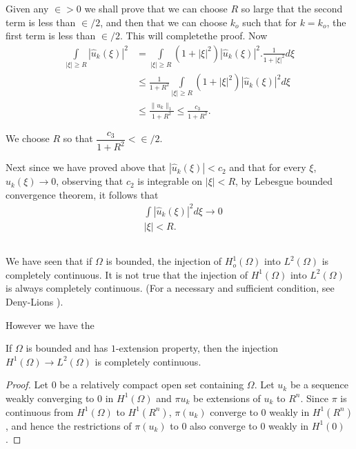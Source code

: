 \noindent
Given any $\in > 0$ we shall prove that we can choose $R$ so
large that the second term is less than $\in / 2$, and then
that we can choose $k_o$ such that for $k = k_o$, the first term is
less than $\in / 2$. This will complete\pageoriginale the proof. Now 
\begin{align*}
\int\limits_{|\xi| \geq R} |\hat{u}_k (\xi )|^2 & = \int\limits_{|\xi|
  \geq R} (1+ |\xi|^2) |\hat{u}_k (\xi )|^2 . \frac{1}{1+ |\xi |^2} d
\xi\\ 
& \leq \frac{1}{1+ R^2} \int\limits_{|\xi| \geq R} (1+ |\xi|^2)
|\hat{u}_k (\xi )|^2 d\xi\\ 
&\leq \frac{\| u_k \|_1}{1+R^2} \leq \frac{c_3 }{1+ R^2}.
\end{align*}

We choose $R$ so that $\dfrac{c_3}{1+ R^2} < \in / 2$.

Next since we have proved above that $|\hat{u}_k (\xi )| < c_2$ and
that for every $\xi$, $\hat{u}_k (\xi) \to 0$, observing that $c_2$ is
integrable on $|\xi| < R$, by Lebesgue bounded convergence theorem, it
follows that 
\begin{align*}
 &\int |\hat{u}_k (\xi )|^2 d \xi \to 0\\
 & |\xi |< R.
\end{align*}

\subsection{}\label{lec9:sec5:subsec2}  %

We have seen that if $\Omega$ is bounded, the
injection of $H^1_o (\Omega)$ into $L^2 (\Omega)$ is completely
continuous. It is not true that the injection of $H^1(\Omega)$ into
$L^2 (\Omega)$ is always completely continuous. (For a  necessary and
sufficient condition, see Deny-Lions \cite{k7}). 

However we have the
\begin{theorem}\label{lec9:sec5:subsec2:thm5.2}%
 If $\Omega$ is bounded and has $1$-extension property, then the
 injection $H^1 (\Omega) \to L^2 (\Omega)$ is completely continuous. 
\end{theorem}

\begin{proof}
Let $0$ be a relatively compact open set containing $\Omega$. Let
$u_k$ be a sequence weakly converging to $0$ in $H^1 (\Omega)$ and
$\pi u_k$ be extensions of $u_k$ to $R^n$. Since $\pi$ is continuous
from $H^1 (\Omega)$ to $H^1 (R^n)$, $\pi (u_k)$ converge to $0$ weakly
in $H^1 (R^n)$, and hence the restrictions of $\pi (u_k)$ to $0$ also
converge to $0$ weakly in $H^1(0)$. 
\end{proof}

